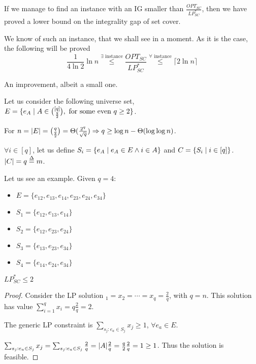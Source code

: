     If we manage to find an instance with an IG smaller than $\frac{OPT_{SC}}{LP_{SC}^*}$, then we have proved a lower bound on the integrality gap of set cover.
    
    We know of such an instance, that we shall see in a moment. As it is the case, the following will be proved
    \[ \dfrac{1}{4 \ln 2} \ln n \overset{\exists \text{ instance}}{\leq} \frac{OPT_{SC}}{LP_{SC}^*} \overset{\forall \text{ instance}}{\leq} \lceil 2 \ln n \rceil \]

    An improvement, albeit a small one.

    Let us consider the following universe set, $E = \{ e_A \; \vert \; A \in \binom{[q]}{\frac{q}{2}}, \text{ for some even } q \geq 2 \}$.

    For $n = \vert E \vert = \binom{q}{\frac{q}{2}} = \Theta(\frac{2^q}{\sqrt{q}}) \Rightarrow q \geq \log n - \Theta(\log \log n)$.

    $\forall i \in [q]$, let us define $S_i = \{ e_A \; \vert \; e_A \in E \wedge i \in A \}$ and $C = \{ S_i \; \vert \; i \in [q] \}$. $\vert C \vert = q \overset{\Delta}{=} m$.

    Let us see an example. Given $q = 4$:
    \begin{itemize}
        \item $E = \{ e_{12}, e_{13}, e_{14}, e_{23}, e_{24}, e_{34} \}$
        \item $S_1 = \{ e_{12}, e_{13}, e_{14} \}$
        \item $S_2 = \{ e_{12}, e_{23}, e_{24} \}$
        \item $S_3 = \{ e_{13}, e_{23}, e_{34} \}$
        \item $S_4 = \{ e_{14}, e_{24}, e_{34} \}$
    \end{itemize}

    \begin{lemma}
        $LP_{SC}^* \leq 2$
    \end{lemma}

    \begin{proof}
        Consider the LP solution $_1 = x_2 = \cdots = x_q = \frac{2}{q}$, with $q = n$.
        This solution has value $\sum_{i=1}^{q} x_i = q \frac{2}{q} = 2$.

        The generic LP constraint is $\sum_{s_j : e_a \in S_j} x_j \geq 1$, $\forall e_a \in E$.

        $\sum_{s_j : e_a \in S_j} x_j = \sum_{s_j : e_a \in S_j} \frac{2}{q} = \vert A \vert \frac{2}{q} = \frac{q}{2} \frac{2}{q} = 1 \geq 1$. Thus the solution is feasible.
    \end{proof}

